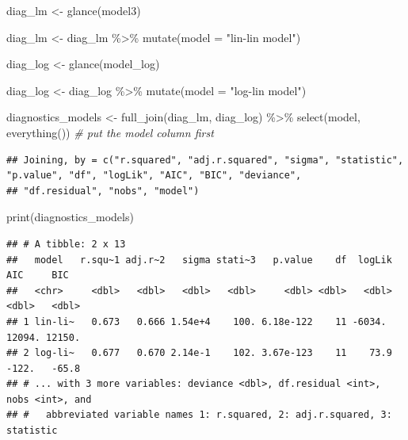 \documentclass[
]{article}
\newenvironment{Shaded}{\begin{snugshade}}{\end{snugshade}}
\newcommand{\AttributeTok}[1]{\textcolor[rgb]{0.77,0.63,0.00}{#1}}
\newcommand{\CommentTok}[1]{\textcolor[rgb]{0.56,0.35,0.01}{\textit{#1}}}
\newcommand{\FunctionTok}[1]{\textcolor[rgb]{0.00,0.00,0.00}{#1}}
\newcommand{\NormalTok}[1]{#1}
\newcommand{\OtherTok}[1]{\textcolor[rgb]{0.56,0.35,0.01}{#1}}
\newcommand{\SpecialCharTok}[1]{\textcolor[rgb]{0.00,0.00,0.00}{#1}}
\newcommand{\StringTok}[1]{\textcolor[rgb]{0.31,0.60,0.02}{#1}}
\begin{document}
\begin{Shaded}
\begin{Highlighting}[]
\NormalTok{diag\_lm }\OtherTok{\textless{}{-}} \FunctionTok{glance}\NormalTok{(model3)}

\NormalTok{diag\_lm }\OtherTok{\textless{}{-}}\NormalTok{ diag\_lm }\SpecialCharTok{\%\textgreater{}\%}
  \FunctionTok{mutate}\NormalTok{(}\AttributeTok{model =} \StringTok{"lin{-}lin model"}\NormalTok{)}

\NormalTok{diag\_log }\OtherTok{\textless{}{-}} \FunctionTok{glance}\NormalTok{(model\_log)}

\NormalTok{diag\_log  }\OtherTok{\textless{}{-}}\NormalTok{ diag\_log }\SpecialCharTok{\%\textgreater{}\%}
  \FunctionTok{mutate}\NormalTok{(}\AttributeTok{model =} \StringTok{"log{-}lin model"}\NormalTok{)}

\NormalTok{diagnostics\_models }\OtherTok{\textless{}{-}} \FunctionTok{full\_join}\NormalTok{(diag\_lm, diag\_log) }\SpecialCharTok{\%\textgreater{}\%}
  \FunctionTok{select}\NormalTok{(model, }\FunctionTok{everything}\NormalTok{()) }\CommentTok{\# put the \textasciigrave{}model\textasciigrave{} column first}
\end{Highlighting}
\end{Shaded}

\begin{verbatim}
## Joining, by = c("r.squared", "adj.r.squared", "sigma", "statistic", "p.value", "df", "logLik", "AIC", "BIC", "deviance",
## "df.residual", "nobs", "model")
\end{verbatim}

\begin{Shaded}
\begin{Highlighting}[]
\FunctionTok{print}\NormalTok{(diagnostics\_models)}
\end{Highlighting}
\end{Shaded}

\begin{verbatim}
## # A tibble: 2 x 13
##   model   r.squ~1 adj.r~2   sigma stati~3   p.value    df  logLik    AIC     BIC
##   <chr>     <dbl>   <dbl>   <dbl>   <dbl>     <dbl> <dbl>   <dbl>  <dbl>   <dbl>
## 1 lin-li~   0.673   0.666 1.54e+4    100. 6.18e-122    11 -6034.  12094. 12150. 
## 2 log-li~   0.677   0.670 2.14e-1    102. 3.67e-123    11    73.9  -122.   -65.8
## # ... with 3 more variables: deviance <dbl>, df.residual <int>, nobs <int>, and
## #   abbreviated variable names 1: r.squared, 2: adj.r.squared, 3: statistic
\end{verbatim}
\end{document}
